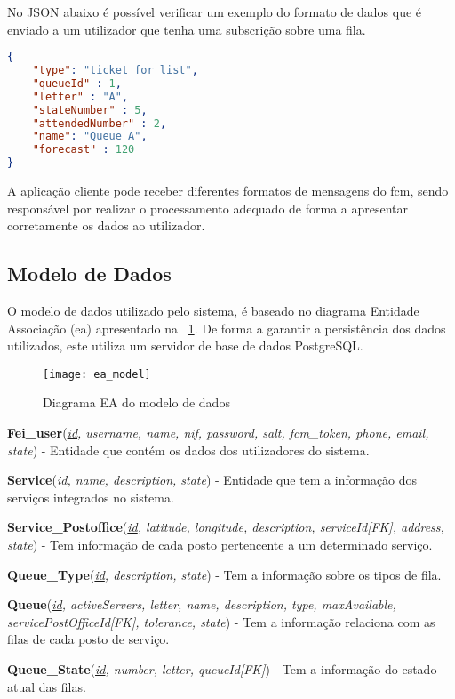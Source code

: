 {No JSON abaixo é possível verificar um exemplo do formato de dados que é enviado a um utilizador que tenha uma subscrição sobre uma fila. 

\begin{lstlisting}[language=json,firstnumber=1]
{
	"type": "ticket_for_list",
	"queueId" : 1,
	"letter" : "A",
	"stateNumber" : 5,
	"attendedNumber" : 2,
	"name": "Queue A",
	"forecast" : 120
}
\end{lstlisting}

A aplicação cliente pode receber diferentes formatos de mensagens do \acrshort{fcm}, sendo responsável por realizar o processamento adequado de forma a apresentar corretamente os dados ao utilizador.

\newpage

\subsection{Modelo de Dados}
O modelo de dados utilizado pelo sistema, é baseado no diagrama Entidade Associação (\acrshort{ea}) apresentado na \figurename~\ref{fig:model}. De forma a garantir a persistência dos dados utilizados, este utiliza um servidor de base de dados PostgreSQL.

\begin{figure}[ht]
    \centering
    \texttt{[image: ea\_model]}
      \caption{Diagrama EA do modelo de dados}
  \label{fig:model}
\end{figure}

\textbf{Fei\_user}(\textit{\underline{id}, username, name, nif, password, salt, fcm\_token, phone, email, state}) - Entidade que contém os dados dos utilizadores do sistema.

\textbf{Service}(\textit{\underline{id}, name, description, state}) - Entidade que tem a informação dos serviços integrados no sistema.

\textbf{Service\_Postoffice}(\textit{\underline{id}, latitude, longitude, description, serviceId[FK], address, state}) - Tem informação de cada posto pertencente a um determinado serviço.

\textbf{Queue\_Type}(\textit{\underline{id}, description, state}) - Tem a informação sobre os tipos de fila.

\textbf{Queue}(\textit{\underline{id}, activeServers, letter, name, description, type, maxAvailable, servicePostOfficeId[FK], tolerance, state}) - Tem a informação relaciona com as filas de cada posto de serviço.

\textbf{Queue\_State}(\textit{\underline{id}, number, letter, queueId[FK]}) - Tem a informação do estado atual das filas.

}
